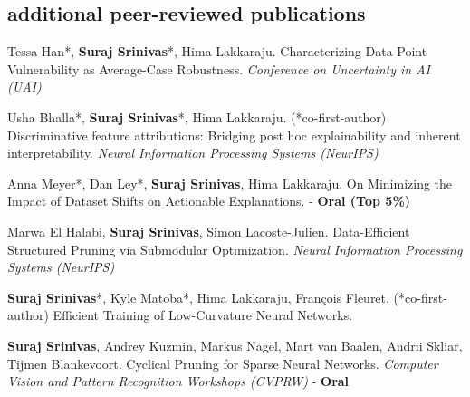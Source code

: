 \documentclass[11pt, a4paper, english]{moderncv}        %
\newcommand{\cvsubsection}[1]{\vspace{0.3cm}\subsection{\large{{#1}}}}
\begin{document}
\cvsubsection{additional peer-reviewed publications}


 {Tessa Han*, \textbf{Suraj Srinivas}*, Hima Lakkaraju. 
\newline Characterizing Data Point Vulnerability as Average-Case Robustness. 
\newline \textit{Conference on Uncertainty in AI (UAI)}}
\vspace*{0.25em}

 {Usha Bhalla*, \textbf{Suraj Srinivas}*, Hima Lakkaraju. (*co-first-author) \newline Discriminative feature attributions: Bridging post hoc explainability and inherent interpretability.
\newline \textit{Neural Information Processing Systems (NeurIPS)}}
\vspace*{0.25em}

 {Anna Meyer*, Dan Ley*, \textbf{Suraj Srinivas}, Hima Lakkaraju. \newline On Minimizing the Impact of Dataset Shifts on Actionable Explanations.  - \textbf{Oral (Top 5\%)}
}
\vspace*{0.25em}

 {Marwa El Halabi, \textbf{Suraj Srinivas}, Simon Lacoste-Julien.
\newline Data-Efficient Structured Pruning via Submodular Optimization. \newline \textit{Neural Information Processing Systems (NeurIPS)}}

\vspace*{0.25em}
 {\textbf{Suraj Srinivas}*, Kyle Matoba*, Hima Lakkaraju, Fran\c{c}ois Fleuret. (*co-first-author) \newline Efficient Training of Low-Curvature Neural Networks. 
}

\vspace*{0.25em}
 {\textbf{Suraj Srinivas}, Andrey Kuzmin, Markus Nagel, Mart van Baalen, \newline Andrii Skliar, Tijmen Blankevoort. \newline Cyclical Pruning for Sparse Neural Networks. 
\newline \textit{Computer Vision and Pattern Recognition Workshops (CVPRW)} - \textbf{Oral}}
\end{document}
